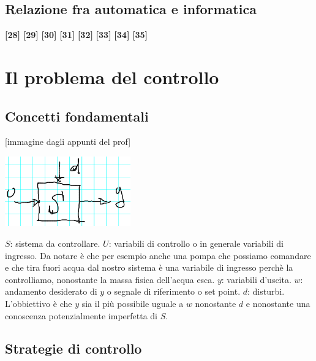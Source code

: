 \subsection{Relazione fra automatica e informatica}
\textbf{[28]}\;
\newline\textbf{[29]}\;
\newline\textbf{[30]}\;
\newline\textbf{[31]}\;
\newline\textbf{[32]}\;
\newline\textbf{[33]}\;
\newline\textbf{[34]}\;
\newline\textbf{[35]}
\newpage
\section{Il problema del controllo}
\subsection{Concetti fondamentali}
[immagine dagli appunti del prof]
\begin{center}
    \includegraphics[height=3cm]{../lezione1/img1.PNG}
\end{center}
$S$: sistema da controllare. \newline
$U$: variabili di controllo o in generale variabili di ingresso. Da notare è che per esempio anche una pompa che possiamo comandare e che tira fuori acqua dal nostro sistema è una variabile di ingresso perchè la controlliamo, nonostante la massa fisica dell'acqua esca.\newline
$y$: variabili d'uscita.\newline
$w$: andamento desiderato di $y$ o segnale di riferimento o set point.\newline
$d$: disturbi.\newline
L'obbiettivo è che $y$ sia il più possibile uguale a $w$ nonostante $d$ e nonostante una conoscenza potenzialmente imperfetta di $S$.
\subsection{Strategie di controllo}
